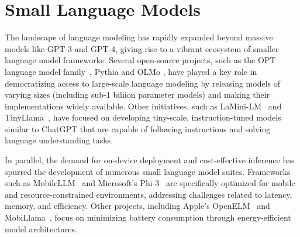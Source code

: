 

\section{Small Language Models}

The landscape of language modeling has rapidly expanded beyond massive models like GPT-3 and GPT-4, giving rise to a vibrant ecosystem of smaller language model frameworks. Several open-source projects, such as the OPT language model family~\citep{zhang2022opt}, Pythia \citep{biderman2023pythia} and OLMo \citep{groeneveld2024olmo}, have played a key role in democratizing access to large-scale language modeling by releasing models of varying sizes (including sub-1 biliion parameter models) and making their implementations widely available. Other initiatives, such as LaMini-LM~\citep{wu2024lamini} and TinyLlama~\citep{zhang2024tinyllama}, have focused on developing tiny-scale, instruction-tuned models similar to ChatGPT that are capable of following instructions and solving language understanding tasks.

In parallel, the demand for on-device deployment and cost-effective inference has spurred the development of numerous small language model suites. Frameworks such as MobileLLM~\citep{liu2024mobilellm} and Microsoft's Phi-3~\citep{abdin2024phi} are specifically optimized for mobile and resource-constrained environments, addressing challenges related to latency, memory, and efficiency. Other projects, including Apple's OpenELM~\citep{mehta2024openelm} and MobiLlama~\citep{thawakar2024mobillama}, focus on minimizing battery consumption through energy-efficient model architectures.

